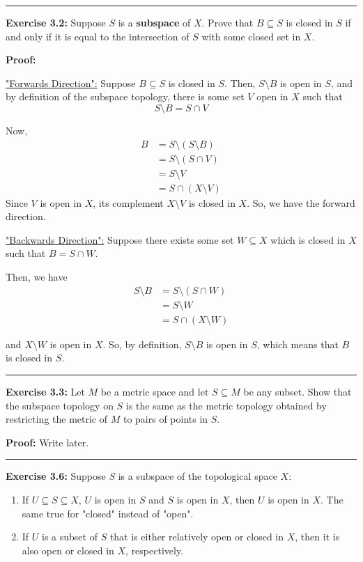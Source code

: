 \documentclass{article}
\begin{document}
\vskip 0.5cm
\hrule
\vskip 0.5cm

\textbf{Exercise 3.2:} Suppose $S$ is a \textbf{subspace} of $X$. Prove that $B \subseteq S$ is closed in $S$ if and only if it is equal to the intersection of $S$ with some closed set in $X$.

\vskip 0.5cm

\textbf{Proof:} 
\vskip 0.5cm

\underline{"Forwards Direction":} Suppose $B \subseteq S$ is closed in $S$. Then, $S \setminus B$ is open in $S$, and by definition of the subspace topology, there is some set $V$ open in $X$ such that 
\[ S \setminus B = S \cap V \]

Now,
\begin{align*}
  B &= S \setminus (S \setminus B) \\
  &= S \setminus (S \cap V) \\
  &= S \setminus V \\
  &= S \cap (X \setminus V)
\end{align*}
Since $V$ is open in $X$, its complement $X \setminus V$ is closed in $X$. So, we have the forward direction.

\vskip 0.5cm
\underline{"Backwards Direction":} Suppose there exists some set $W \subseteq X$ which is closed in $X$ such that $B = S \cap W$.

Then, we have 
\begin{align*}
  S \setminus B &= S \setminus (S \cap W) \\
  &= S \setminus W \\
  &= S \cap (X \setminus W)
\end{align*}

and $X \setminus W$ is open in $X$. So, by definition, $S \setminus B$ is open in $S$, which means that $B$ is closed in $S$. 

\vskip 0.5cm
\hrule
\vskip 0.5cm

\textbf{Exercise 3.3:} Let $M$ be a metric space and let $ S \subseteq M$ be any subset. Show that the subspace topology on $S$ is the same as the metric topology obtained by restricting the metric of $M$ to pairs of points in $S$.

\vskip 0.5cm

\textbf{Proof:} Write later.

\vskip 0.5cm
\hrule
\vskip 0.5cm

\textbf{Exercise 3.6:} Suppose $S$ is a subspace of the topological space $X$:

\begin{enumerate}
  \item If $U \subseteq S \subseteq X$, $U$ is open in $S$ and $S$ is open in $X$, then $U$ is open in $X$. The same true for "closed" instead of "open".
  
  \item If $U$ is a subset of $S$ that is either relatively open or closed in $X$, then it is also open or closed in $X$, respectively.
\end{enumerate}
\end{document}
